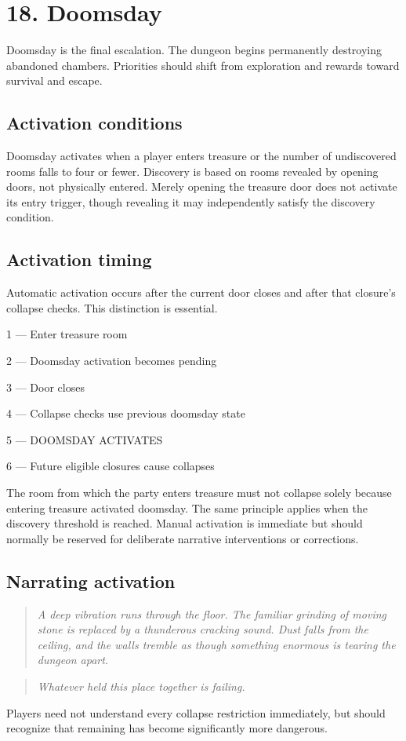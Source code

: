 \section{18. Doomsday}

Doomsday is the final escalation. The dungeon begins permanently destroying abandoned chambers. Priorities should shift from exploration and rewards toward survival and escape.

\subsection{Activation conditions}

Doomsday activates when a player enters treasure or the number of undiscovered rooms falls to four or fewer. Discovery is based on rooms revealed by opening doors, not physically entered. Merely opening the treasure door does not activate its entry trigger, though revealing it may independently satisfy the discovery condition.

\subsection{Activation timing}

Automatic activation occurs after the current door closes and after that closure's collapse checks. This distinction is essential.

1 — Enter treasure room

2 — Doomsday activation becomes pending

3 — Door closes

4 — Collapse checks use previous doomsday state

5 — DOOMSDAY ACTIVATES

6 — Future eligible closures cause collapses

The room from which the party enters treasure must not collapse solely because entering treasure activated doomsday. The same principle applies when the discovery threshold is reached. Manual activation is immediate but should normally be reserved for deliberate narrative interventions or corrections.

\subsection{Narrating activation}

\begin{quote}\itshape A deep vibration runs through the floor. The familiar grinding of moving stone is replaced by a thunderous cracking sound. Dust falls from the ceiling, and the walls tremble as though something enormous is tearing the dungeon apart.\end{quote}

\begin{quote}\itshape Whatever held this place together is failing.\end{quote}

Players need not understand every collapse restriction immediately, but should recognize that remaining has become significantly more dangerous.
